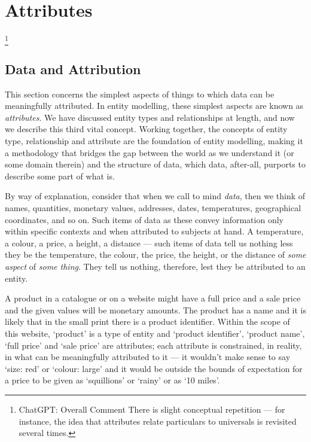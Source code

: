 

\section{Attributes}
\label{Attributes} 
\footnote{ChatGPT: Overall Comment
There is slight conceptual repetition — for instance, the idea that attributes relate particulars to universals is revisited several times.} 
\subsection{Data and Attribution}
\mynote
This section concerns the simplest aspects of things 
to which data can be meaningfully attributed. 
In entity modelling, these simplest aspects are known as \textit{attributes}.
We have discussed entity types and relationships at length, and now  we describe this  third vital concept.
Working together, the concepts of entity type, relationship and attribute
are the foundation of entity modelling, making it a methodology that  bridges the gap between the world as we understand it (or some domain therein) and the structure of data, which data, after-all, purports to describe some part of what is. 

\mynote
By way of explanation, 
consider that when we call to mind \textit{data}, 
then we think of names, quantities, monetary values, 
addresses, dates, temperatures, geographical coordinates, and so on. 
Such items of data as these convey information only within specific contexts and when attributed 
to subjects at hand. 
A temperature, a colour, a price, a height, a distance — such items of data 
tell us nothing less they be the temperature, the colour, the price, the height, or the 
distance of \textit{some aspect} of \textit{some thing}. 
They tell us nothing, therefore, lest they be attributed to an entity.

\mynote
A product in a catalogue or on a website  might have a full price and a sale price
and the given values will be monetary amounts.
The product has a name 
and it is likely that in the small print there is a product identifier.
Within the scope of this website, `product' is a type of entity
and `product identifier', `product name',  `full price' and `sale price' are attributes;
each attribute is constrained, in reality, in what can be meaningfully attributed to it ---
it wouldn't make sense to say `size: red' or `colour: large' and
it  would be outside the bounds of expectation 
for a price to be given as `squillions' or `rainy' or as `10 miles'.


